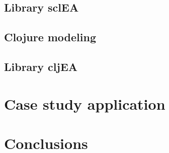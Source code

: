 \documentclass[runningheads]{llncs}
\begin{document}
\subsection{Library sclEA}
    

\subsection{Clojure modeling}
    

\subsection{Library cljEA}
    

\section{Case study application}
\label{sec:results}
    

\section{Conclusions}
\label{sec:conclusions}
    


%




\end{document}
